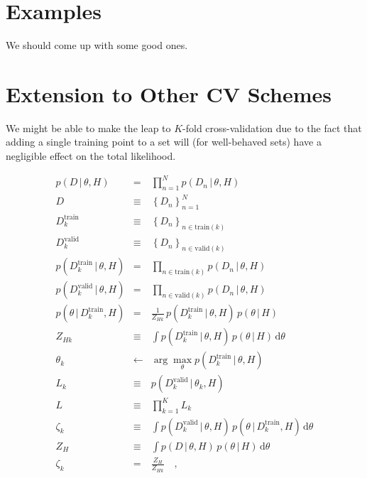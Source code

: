 \documentclass[12pt]{article}
\newcommand{\given}{\,|\,}
\newcommand{\setof}[1]{\left\{{#1}\right\}}
\newcommand{\train}{\mathrm{train}}
\newcommand{\valid}{\mathrm{valid}}
\newcommand{\dd}{\mathrm{d}}
\begin{document}
\section{Examples}
We should come up with some good ones.

\section{Extension to Other CV Schemes}

We might be able to make the leap to $K$-fold cross-validation due to the fact
that adding a single training point to a set will (for well-behaved sets)
have a negligible effect on the total likelihood.

\begin{eqnarray}
p(D\given\theta,H) &=& \prod_{n=1}^N p(D_n\given\theta,H)
\\
D &\equiv& \setof{D_n}_{n=1}^N
\\
D^\train_k &\equiv& \setof{D_n}_{n\in\train(k)}
\\
D^\valid_k &\equiv& \setof{D_n}_{n\in\valid(k)}
\\
p(D^\train_k\given\theta,H) &=& \prod_{n\in\train(k)} p(D_n\given\theta,H)
\\
p(D^\valid_k\given\theta,H) &=& \prod_{n\in\valid(k)} p(D_n\given\theta,H)
\\
p(\theta\given D^\train_k,H) &=& \frac{1}{Z_{Hk}}\,p(D^\train_k\given\theta,H)\,p(\theta\given H)
\\
Z_{Hk} &\equiv& \int p(D^\train_k\given\theta,H)\,p(\theta\given H)\,\dd\theta
\\
\theta_k &\leftarrow& \arg\max_\theta p(D^\train_k\given\theta,H)
\\
L_k &\equiv& p(D^\valid_k\given\theta_k,H)
\\
L &\equiv& \prod_{k=1}^K L_k
\\
\zeta_k &\equiv& \int p(D^\valid_k\given\theta,H)\,p(\theta\given D^\train_k,H)\,\dd\theta
\\
Z_H &\equiv& \int p(D\given\theta,H)\,p(\theta\given H)\,\dd\theta
\\
\zeta_k &=& \frac{Z_H}{Z_{Hk}}
\quad,
\end{eqnarray}
\end{document}
